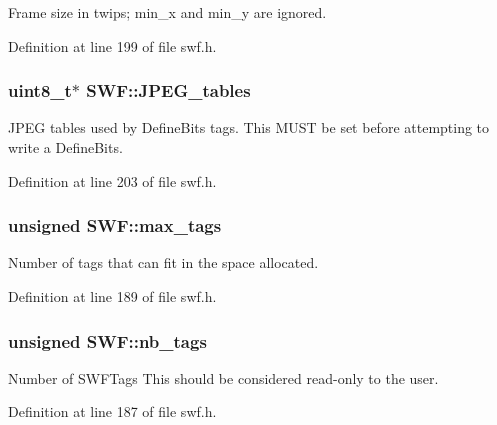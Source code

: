 Frame size in twips; min\+\_\+x and min\+\_\+y are ignored. 



Definition at line 199 of file swf.\+h.

\hypertarget{struct_s_w_f_ae63eda75022e0100a17e78b200d607a4}{}
\subsubsection[{J\+P\+E\+G\+\_\+tables}]{\setlength{\rightskip}{0pt plus 5cm}uint8\+\_\+t$\ast$ S\+W\+F\+::\+J\+P\+E\+G\+\_\+tables\hspace{0.3cm}{\ttfamily [protected]}}\label{struct_s_w_f_ae63eda75022e0100a17e78b200d607a4}
J\+P\+E\+G tables used by Define\+Bits tags. This M\+U\+S\+T be set before attempting to write a Define\+Bits. 

Definition at line 203 of file swf.\+h.

\hypertarget{struct_s_w_f_a341ef0cf50f79cad21ae0db9fe483dc1}{}
\subsubsection[{max\+\_\+tags}]{\setlength{\rightskip}{0pt plus 5cm}unsigned S\+W\+F\+::max\+\_\+tags\hspace{0.3cm}{\ttfamily [protected]}}\label{struct_s_w_f_a341ef0cf50f79cad21ae0db9fe483dc1}


Number of tags that can fit in the space allocated. 



Definition at line 189 of file swf.\+h.

\hypertarget{struct_s_w_f_ae9a2ba32a4a650ec76d45cc5211f77b0}{}
\subsubsection[{nb\+\_\+tags}]{\setlength{\rightskip}{0pt plus 5cm}unsigned S\+W\+F\+::nb\+\_\+tags}\label{struct_s_w_f_ae9a2ba32a4a650ec76d45cc5211f77b0}
Number of S\+W\+F\+Tags This should be considered read-\/only to the user. 

Definition at line 187 of file swf.\+h.

